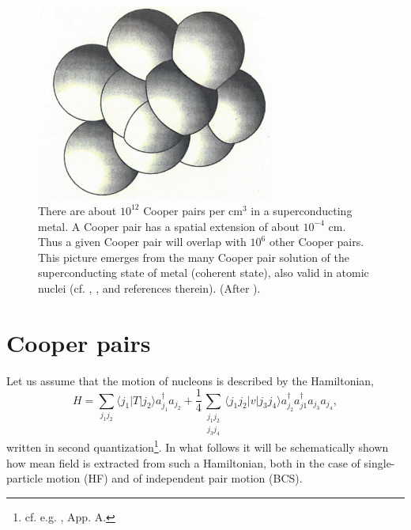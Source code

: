 \begin{figure}
\centerline{\includegraphics*[width=0.7\textwidth,angle=0]{nutshell/figs/fig1A5.pdf}}
\caption{There are about $10^{12}$ Cooper pairs per cm$^{3}$ in a superconducting metal. A Cooper pair has a spatial extension of about $10^{-4}$ cm. Thus a given Cooper pair will overlap with  $10^{6}$ other Cooper pairs. This picture emerges from  the many Cooper pair solution of the superconducting state of metal  (coherent state), also valid in atomic nuclei (cf. \cite{Schrieffer:64}, \cite{Brink:05}, and references therein). (After \cite{Rogovin:76}).}\label{fig1A5}
\end{figure}
 \section{Cooper pairs}\label{App1D}
Let us assume that the motion of nucleons is described by the Hamiltonian, 
 \begin{equation*}
 H=\sum_{j_1j_2}\langle j_1|T|j_2\rangle a_{j_1}^{\dagger}a_{j_2}+\frac{1}{4}\sum_{\substack{j_1j_2\\j_3j_4}}\langle j_1j_2|v|j_3j_4\rangle a_{j_2}^{\dagger} a_{j1}^{\dagger} a_{j_3} a_{j_4},
 \end{equation*}
 written in second quantization\footnote{cf. e.g. \cite{Brink:05}, App. A.}.
In what follows it will be schematically shown how mean field is extracted from such a Hamiltonian, both in the case of single-particle motion (HF) and of independent pair motion (BCS).  





